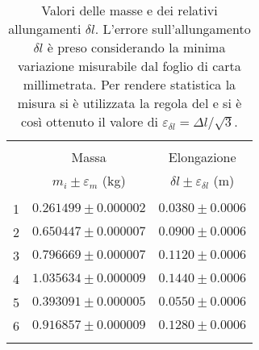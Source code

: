 \begin{table}[t]
  \centering
  \footnotesize
  \caption{Valori delle masse e dei relativi allungamenti $\delta l$. L'errore sull'allungamento $\delta l$ è 
  preso considerando la minima variazione misurabile dal foglio di carta millimetrata. Per rendere statistica 
  la misura si è utilizzata la regola del \treSigma e si è così ottenuto il valore di 
  $\varepsilon_{\delta l} = \Delta l / \sqrt{3}$.}
  \label{table:sts_values}
  \begin{tabular}{lcc}
      \hline\hline\\[-1.5ex]
        & Massa                      & Elongazione                             \\[+0.5ex]
        & $m_i\pm\varepsilon_m$ (kg) & $\delta l\pm\varepsilon_{\delta l}$ (m) \\[+0.5ex] \hline \\[-1.5ex]
      1 & $0.261499\pm0.000002$      & $0.0380\pm0.0006$                       \\[+0.5ex]
      2 & $0.650447\pm0.000007$      & $0.0900\pm0.0006$                       \\[+0.5ex]
      3 & $0.796669\pm0.000007$      & $0.1120\pm0.0006$                       \\[+0.5ex]
      4 & $1.035634\pm0.000009$      & $0.1440\pm0.0006$                       \\[+0.5ex]
      5 & $0.393091\pm0.000005$      & $0.0550\pm0.0006$                       \\[+0.5ex]
      6 & $0.916857\pm0.000009$      & $0.1280\pm0.0006$                       \\[+0.5ex]
      \hline \\[-1.5ex]
  \end{tabular}
\end{table}

